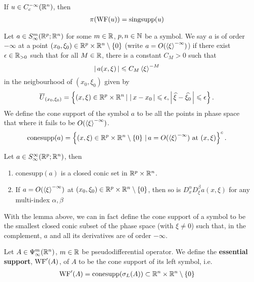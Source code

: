 \documentclass{article}
\begin{document}
\begin{fprop}
    If $u \in C^{-\infty}_c(\R^n)$, then 
    \begin{align*}
    \pi(\WF(u)) = \mathrm{singsupp}(u)
    \end{align*}
\end{fprop}


\begin{fdefinition}
    Let $a \in S^{m}_\infty(\R^{p}; \R^n)$ for some $m \in \R$, $p, n \in \N$ be a symbol. We say $a$ is of order $-\infty$ at a point $(x_0, \xi_0) \in \R^p \times \R^n \setminus \set{0}$ (write $a = O(\sym[\xi]^{-\infty})$) if there exist $\epsilon \in \R_{> 0}$ such that for all $M \in \R$, there is a constant $C_M > 0$ such that 
    \[
    \abs{a(x, \xi)} \leq C_M \sym[\xi]^{-M}
    \]
    in the neigbourhood of $(x_0, \xi_0)$ given by
    \[
    \overline{U}_{(x_0, \xi_0)} = \set{(x, \xi) \in \R^p \times \R^n \wh \abs{x - x_0} \leq \epsilon, \abs{\widehat{\xi} - \widehat{\xi_0}} \leq \epsilon}. 
    \]
    We define the cone support of the symbol $a$ to be all the points in phase space that where it fails to be $O(\sym[\xi]^{-\infty})$. 
    \[
    \mathrm{conesupp}(a) = \set{(x, \xi) \in \R^p \times \R^n \setminus \set{0} \wh a = O(\sym[\xi]^{-\infty}) \text{ at } (x, \xi)}^c. 
    \]
\end{fdefinition}

\begin{flemma}
    Let $a \in S^{\infty}_\infty(\R^{p}; \R^n)$, then 
    \begin{enumerate}
        \item $\mathrm{conesupp}(a)$ is a closed conic set in $\R^p \times \R^n$. 
        \item If $a = O(\sym[\xi]^{-\infty})$ at $(x_0, \xi_0) \in \R^p \times \R^n \setminus \set{0}$, then so is $D^\alpha_x D^\beta_\xi a(x, \xi)$ for any multi-index $\alpha, \beta$
    \end{enumerate}
\end{flemma}

With the lemma above, we can in fact define the cone support of a symbol to be the smallest closed conic subset of the phase space (with $\xi \neq 0$) such that, in the complement, $a$ and all its derivatives are of order $-\infty$.\\
 


\begin{fdefinition}
    Let $A \in \Psi^m_\infty(\R^n)$,  $m \in \R$ be pseudodifferential operator. We define the \textbf{essential support}, $\WF'(A)$, of $A$ to be the cone support of its left symbol, i.e. 
    \begin{align*}
    \WF'(A) = \mathrm{conesupp}(\sigma_L(A)) \subset \R^n \times \R^n \setminus \set{0}
    \end{align*}
\end{fdefinition}
\end{document}

